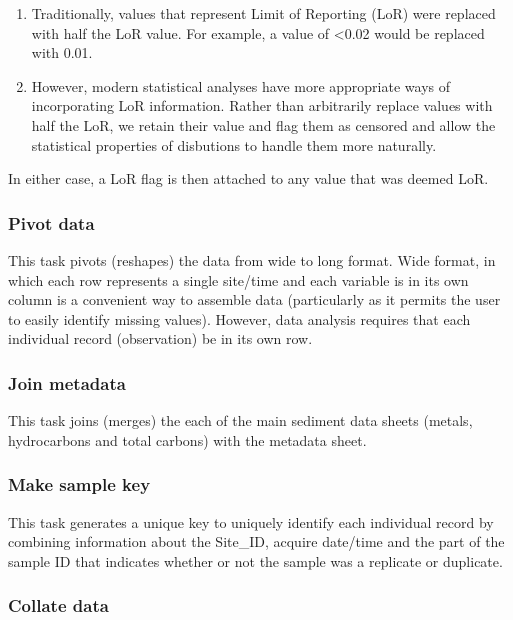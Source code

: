 \documentclass[
  8pt,
  a4paper]{article}
\providecommand{\tightlist}{%
  \setlength{\itemsep}{0pt}\setlength{\parskip}{0pt}}
\begin{document}
\begin{enumerate}
\def\labelenumi{\arabic{enumi}.}
\tightlist
\item
  Traditionally, values that represent Limit of Reporting (LoR) were
  replaced with half the LoR value. For example, a value of
  \textless0.02 would be replaced with 0.01.
\item
  However, modern statistical analyses have more appropriate ways of
  incorporating LoR information. Rather than arbitrarily replace values
  with half the LoR, we retain their value and flag them as censored and
  allow the statistical properties of disbutions to handle them more
  naturally.
\end{enumerate}

In either case, a LoR flag is then attached to any value that was deemed
LoR.

\subsubsection{Pivot data}\label{pivot-data}

This task pivots (reshapes) the data from wide to long format. Wide
format, in which each row represents a single site/time and each
variable is in its own column is a convenient way to assemble data
(particularly as it permits the user to easily identify missing values).
However, data analysis requires that each individual record
(observation) be in its own row.

\subsubsection{Join metadata}\label{join-metadata}

This task joins (merges) the each of the main sediment data sheets
(metals, hydrocarbons and total carbons) with the metadata sheet.

\subsubsection{Make sample key}\label{make-sample-key}

This task generates a unique key to uniquely identify each individual
record by combining information about the Site\_ID, acquire date/time
and the part of the sample ID that indicates whether or not the sample
was a replicate or duplicate.

\subsubsection{Collate data}\label{collate-data}
\end{document}
